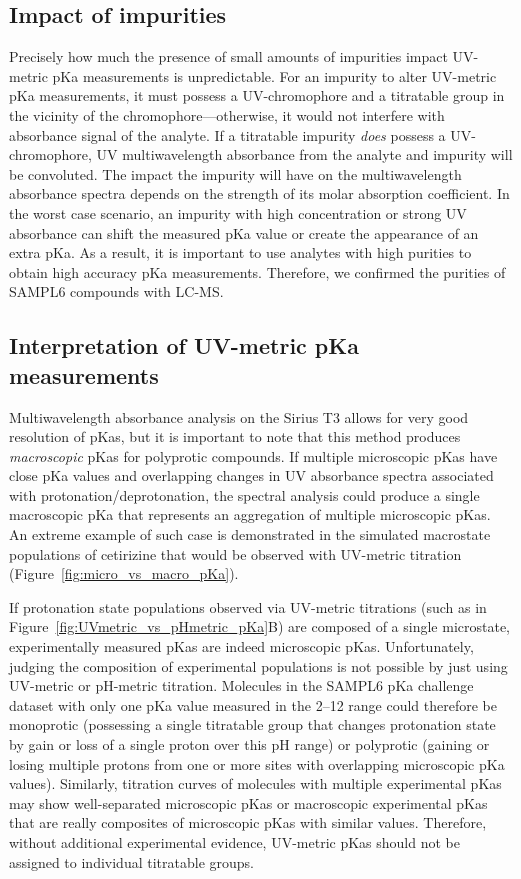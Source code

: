 \documentclass[9pt,lineno]{elife}
\begin{document}
\subsection{Impact of impurities}

Precisely how much the presence of small amounts of impurities impact UV-metric pKa measurements is unpredictable. 
For an impurity to alter UV-metric pKa measurements, it must possess a UV-chromophore and a titratable group in the vicinity of the chromophore---otherwise, it would not interfere with absorbance signal of the analyte. 
If a titratable impurity \emph{does} possess a UV-chromophore, UV multiwavelength absorbance from the analyte and impurity will be convoluted. 
The impact the impurity will have on the multiwavelength absorbance spectra depends on the strength of its molar absorption coefficient. 
In the worst case scenario, an impurity with high concentration or strong UV absorbance can shift the measured pKa value or create the appearance of an extra pKa. As a result, it is important to use analytes with high purities to obtain high accuracy pKa measurements. 
Therefore, we confirmed the purities of SAMPL6 compounds with LC-MS.   

\subsection{Interpretation of UV-metric pKa measurements}

Multiwavelength absorbance analysis on the Sirius T3 allows for very good resolution of pKas, but it is important to note that this method produces \emph{macroscopic} pKas for polyprotic compounds. 
If multiple microscopic pKas have close pKa values and overlapping changes in UV absorbance spectra associated with protonation/deprotonation, the spectral analysis could produce a single macroscopic pKa that represents an aggregation of multiple microscopic pKas. 
An extreme example of such case is demonstrated in the simulated macrostate populations of cetirizine that would be observed with UV-metric titration (Figure~\ref{fig:micro_vs_macro_pKa}).

If protonation state populations observed via UV-metric titrations (such as in Figure~\ref{fig:UVmetric_vs_pHmetric_pKa}B) are composed of a single microstate, experimentally measured pKas are indeed microscopic pKas.  
Unfortunately, judging the composition of experimental populations is not possible by just using UV-metric or pH-metric titration. 
Molecules in the SAMPL6 pKa challenge dataset with only one pKa value measured in the 2--12 range could therefore be monoprotic (possessing a single titratable group that changes protonation state by gain or loss of a single proton over this pH range) or polyprotic (gaining or losing multiple protons from one or more sites with overlapping microscopic pKa values). 
Similarly, titration curves of molecules with multiple experimental pKas may show well-separated microscopic pKas or macroscopic experimental pKas that are really composites of microscopic pKas with similar values. 
Therefore, without additional experimental evidence, UV-metric pKas should not be assigned to individual titratable groups. 
\end{document}
